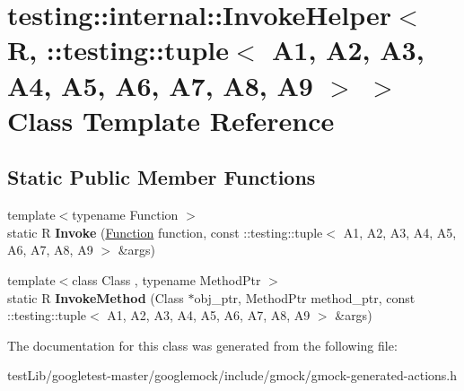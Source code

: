 \hypertarget{classtesting_1_1internal_1_1InvokeHelper_3_01R_00_01_1_1testing_1_1tuple_3_01A1_00_01A2_00_01A3_1c5f66c8b5e7674a520f1ea38507628c}{}\section{testing\+:\+:internal\+:\+:Invoke\+Helper$<$ R, \+:\+:testing\+:\+:tuple$<$ A1, A2, A3, A4, A5, A6, A7, A8, A9 $>$ $>$ Class Template Reference}
\label{classtesting_1_1internal_1_1InvokeHelper_3_01R_00_01_1_1testing_1_1tuple_3_01A1_00_01A2_00_01A3_1c5f66c8b5e7674a520f1ea38507628c}
\subsection*{Static Public Member Functions}
\begin{DoxyCompactItemize}
\item 
\mbox{\label{classtesting_1_1internal_1_1InvokeHelper_3_01R_00_01_1_1testing_1_1tuple_3_01A1_00_01A2_00_01A3_1c5f66c8b5e7674a520f1ea38507628c_afd0d2a5a81d947b5b11dc2ede6e49a0e}} 
{\footnotesize template$<$typename Function $>$ }\\static R {\bfseries Invoke} (\hyperlink{structtesting_1_1internal_1_1Function}{Function} function, const \+::testing\+::tuple$<$ A1, A2, A3, A4, A5, A6, A7, A8, A9 $>$ \&args)
\item 
\mbox{\label{classtesting_1_1internal_1_1InvokeHelper_3_01R_00_01_1_1testing_1_1tuple_3_01A1_00_01A2_00_01A3_1c5f66c8b5e7674a520f1ea38507628c_ab468cf4a3e1ff2fa33a60ce3459c17f7}} 
{\footnotesize template$<$class Class , typename Method\+Ptr $>$ }\\static R {\bfseries Invoke\+Method} (Class $\ast$obj\+\_\+ptr, Method\+Ptr method\+\_\+ptr, const \+::testing\+::tuple$<$ A1, A2, A3, A4, A5, A6, A7, A8, A9 $>$ \&args)
\end{DoxyCompactItemize}


The documentation for this class was generated from the following file\+:\begin{DoxyCompactItemize}
\item 
test\+Lib/googletest-\/master/googlemock/include/gmock/gmock-\/generated-\/actions.\+h\end{DoxyCompactItemize}

